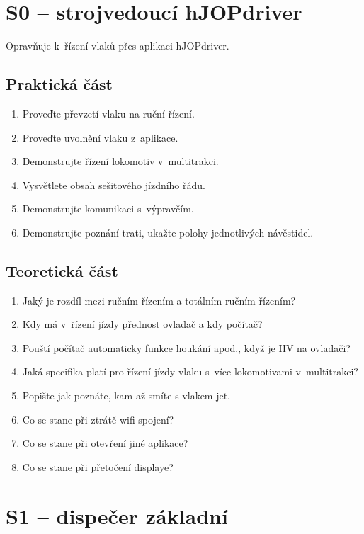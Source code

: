 \documentclass[12pt,a4paper]{article}
\begin{document}
\section{S0 – strojvedoucí hJOPdriver}

Opravňuje k~řízení vlaků přes aplikaci hJOPdriver.

\subsection{Praktická část}

\begin{enumerate}[leftmargin=*]
\item Proveďte převzetí vlaku na ruční řízení.
\item Proveďte uvolnění vlaku z~aplikace.
\item Demonstrujte řízení lokomotiv v~multitrakci.
\item Vysvětlete obsah sešitového jízdního řádu.
\item Demonstrujte komunikaci s~výpravčím.
\item Demonstrujte poznání trati, ukažte polohy jednotlivých návěstidel.
\end{enumerate}

\subsection{Teoretická část}
\begin{enumerate}[leftmargin=*]
\item Jaký je rozdíl mezi ručním řízením a totálním ručním řízením?
\item Kdy má v~řízení jízdy přednost ovladač a kdy počítač?
\item Pouští počítač automaticky funkce houkání apod., když je HV na ovladači?
\item Jaká specifika platí pro řízení jízdy vlaku s~více lokomotivami v~multitrakci?
\item Popište jak poznáte, kam až smíte s vlakem jet.
\item Co se stane při ztrátě wifi spojení?
\item Co se stane při otevření jiné aplikace?
\item Co se stane při přetočení displaye?
\end{enumerate}

\newpage

\section{S1 – dispečer základní}
\end{document}
